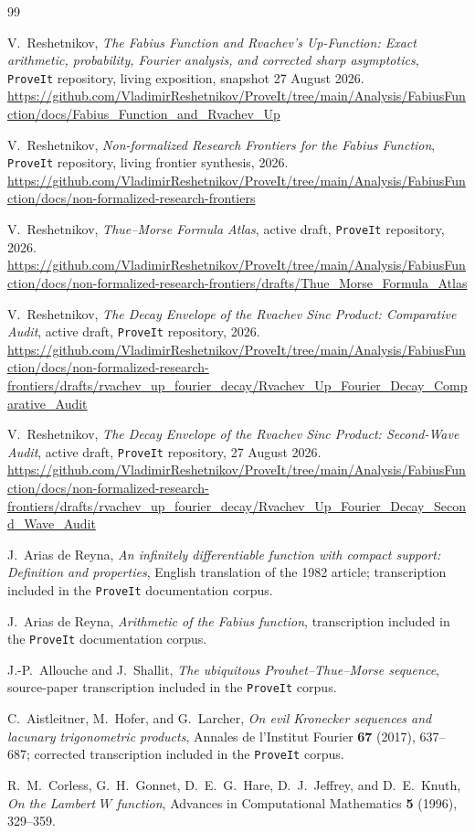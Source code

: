 \documentclass[11pt,oneside]{article}
\theoremstyle{definition}
\theoremstyle{remark}
\begin{document}
\begin{thebibliography}{99}

V.~Reshetnikov,
\emph{The Fabius Function and Rvachev's Up-Function: Exact arithmetic, probability,
Fourier analysis, and corrected sharp asymptotics},
\texttt{ProveIt} repository, living exposition, snapshot 27 August 2026.
\url{https://github.com/VladimirReshetnikov/ProveIt/tree/main/Analysis/FabiusFunction/docs/Fabius_Function_and_Rvachev_Up}

V.~Reshetnikov,
\emph{Non-formalized Research Frontiers for the Fabius Function},
\texttt{ProveIt} repository, living frontier synthesis, 2026.
\url{https://github.com/VladimirReshetnikov/ProveIt/tree/main/Analysis/FabiusFunction/docs/non-formalized-research-frontiers}

V.~Reshetnikov,
\emph{Thue--Morse Formula Atlas}, active draft, \texttt{ProveIt} repository, 2026.
\url{https://github.com/VladimirReshetnikov/ProveIt/tree/main/Analysis/FabiusFunction/docs/non-formalized-research-frontiers/drafts/Thue_Morse_Formula_Atlas}

V.~Reshetnikov,
\emph{The Decay Envelope of the Rvachev Sinc Product: Comparative Audit},
active draft, \texttt{ProveIt} repository, 2026.
\url{https://github.com/VladimirReshetnikov/ProveIt/tree/main/Analysis/FabiusFunction/docs/non-formalized-research-frontiers/drafts/rvachev_up_fourier_decay/Rvachev_Up_Fourier_Decay_Comparative_Audit}

V.~Reshetnikov,
\emph{The Decay Envelope of the Rvachev Sinc Product: Second-Wave Audit},
active draft, \texttt{ProveIt} repository, 27 August 2026.
\url{https://github.com/VladimirReshetnikov/ProveIt/tree/main/Analysis/FabiusFunction/docs/non-formalized-research-frontiers/drafts/rvachev_up_fourier_decay/Rvachev_Up_Fourier_Decay_Second_Wave_Audit}

J.~Arias de Reyna,
\emph{An infinitely differentiable function with compact support: Definition and
properties}, English translation of the 1982 article; transcription included in the
\texttt{ProveIt} documentation corpus.

J.~Arias de Reyna,
\emph{Arithmetic of the Fabius function}, transcription included in the
\texttt{ProveIt} documentation corpus.

J.-P.~Allouche and J.~Shallit,
\emph{The ubiquitous Prouhet--Thue--Morse sequence}, source-paper transcription included
in the \texttt{ProveIt} corpus.

C.~Aistleitner, M.~Hofer, and G.~Larcher,
\emph{On evil Kronecker sequences and lacunary trigonometric products},
Annales de l'Institut Fourier \textbf{67} (2017), 637--687; corrected transcription included
in the \texttt{ProveIt} corpus.

R.~M.~Corless, G.~H.~Gonnet, D.~E.~G.~Hare, D.~J.~Jeffrey, and D.~E.~Knuth,
\emph{On the Lambert $W$ function},
Advances in Computational Mathematics \textbf{5} (1996), 329--359.

\end{thebibliography}
\end{document}
